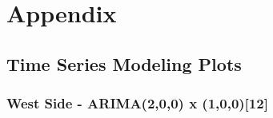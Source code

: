 \documentclass{article} %
\begin{document}
\clearpage
\newpage

\section{Appendix}
\label{appendix}


\subsection{Time Series Modeling Plots}
\label{appendix_regression}

 
\subsubsection{West Side - ARIMA(2,0,0) x (1,0,0)[12]}
 

 
 
\end{document}
